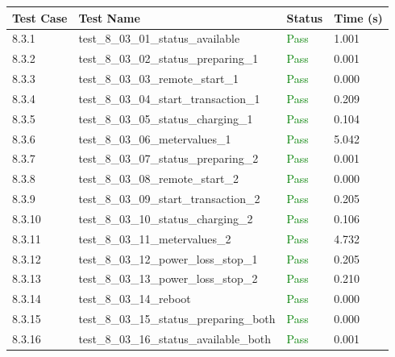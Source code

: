 \documentclass{article}
\begin{document}
\begin{longtable}{p{} p{} p{} p{}}
\toprule
\textbf{Test Case} & \textbf{Test Name} & \textbf{Status} & \textbf{Time (s)} \\
\midrule
\endhead
8.3.1 & test\_8\_03\_01\_status\_available & \textcolor{green}{Pass} & 1.001 \\
8.3.2 & test\_8\_03\_02\_status\_preparing\_1 & \textcolor{green}{Pass} & 0.001 \\
8.3.3 & test\_8\_03\_03\_remote\_start\_1 & \textcolor{green}{Pass} & 0.000 \\
8.3.4 & test\_8\_03\_04\_start\_transaction\_1 & \textcolor{green}{Pass} & 0.209 \\
8.3.5 & test\_8\_03\_05\_status\_charging\_1 & \textcolor{green}{Pass} & 0.104 \\
8.3.6 & test\_8\_03\_06\_metervalues\_1 & \textcolor{green}{Pass} & 5.042 \\
8.3.7 & test\_8\_03\_07\_status\_preparing\_2 & \textcolor{green}{Pass} & 0.001 \\
8.3.8 & test\_8\_03\_08\_remote\_start\_2 & \textcolor{green}{Pass} & 0.000 \\
8.3.9 & test\_8\_03\_09\_start\_transaction\_2 & \textcolor{green}{Pass} & 0.205 \\
8.3.10 & test\_8\_03\_10\_status\_charging\_2 & \textcolor{green}{Pass} & 0.106 \\
8.3.11 & test\_8\_03\_11\_metervalues\_2 & \textcolor{green}{Pass} & 4.732 \\
8.3.12 & test\_8\_03\_12\_power\_loss\_stop\_1 & \textcolor{green}{Pass} & 0.205 \\
8.3.13 & test\_8\_03\_13\_power\_loss\_stop\_2 & \textcolor{green}{Pass} & 0.210 \\
8.3.14 & test\_8\_03\_14\_reboot & \textcolor{green}{Pass} & 0.000 \\
8.3.15 & test\_8\_03\_15\_status\_preparing\_both & \textcolor{green}{Pass} & 0.000 \\
8.3.16 & test\_8\_03\_16\_status\_available\_both & \textcolor{green}{Pass} & 0.001 \\
\bottomrule
\end{longtable}
\end{document}

